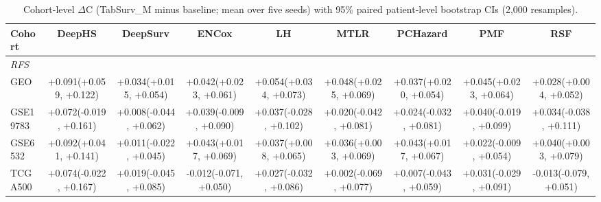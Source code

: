 \begin{table}[t]
\centering
\caption{Cohort-level $\Delta$C (TabSurv\_M minus baseline; mean over five seeds) with 95\% paired patient-level bootstrap CIs (2{,}000 resamples).}
\label{tab:per_cohort_delta}
\scriptsize
\setlength{\tabcolsep}{2pt}
\begin{tabular}{lcccccccc}
\toprule
Cohort & DeepHS & DeepSurv & ENCox & LH & MTLR & PCHazard & PMF & RSF \\
\midrule
\multicolumn{9}{l}{\textit{RFS}} \\
GEO & +0.091\newline(+0.059, +0.122) & +0.034\newline(+0.015, +0.054) & +0.042\newline(+0.023, +0.061) & +0.054\newline(+0.034, +0.073) & +0.048\newline(+0.025, +0.069) & +0.037\newline(+0.020, +0.054) & +0.045\newline(+0.023, +0.064) & +0.028\newline(+0.004, +0.052) \\
GSE19783 & +0.072\newline(-0.019, +0.161) & +0.008\newline(-0.044, +0.062) & +0.039\newline(-0.009, +0.090) & +0.037\newline(-0.028, +0.102) & +0.020\newline(-0.042, +0.081) & +0.024\newline(-0.032, +0.081) & +0.040\newline(-0.019, +0.099) & +0.034\newline(-0.038, +0.111) \\
GSE6532 & +0.092\newline(+0.041, +0.141) & +0.011\newline(-0.022, +0.045) & +0.043\newline(+0.017, +0.069) & +0.037\newline(+0.008, +0.065) & +0.036\newline(+0.003, +0.069) & +0.043\newline(+0.017, +0.067) & +0.022\newline(-0.009, +0.054) & +0.040\newline(+0.003, +0.079) \\
TCGA500 & +0.074\newline(-0.022, +0.167) & +0.019\newline(-0.045, +0.085) & -0.012\newline(-0.071, +0.050) & +0.027\newline(-0.032, +0.086) & +0.002\newline(-0.069, +0.077) & +0.007\newline(-0.043, +0.059) & +0.031\newline(-0.029, +0.091) & -0.013\newline(-0.079, +0.051) \\

\end{tabular}
\end{table}

